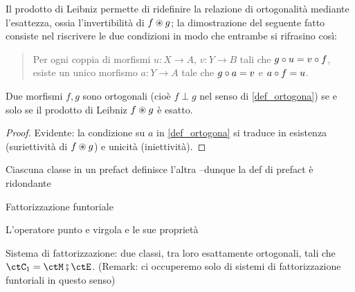 Il prodotto di Leibniz permette di ridefinire la relazione di ortogonalità mediante l'esattezza, ossia l'invertibilità di \(f\oast g\); la dimostrazione del seguente fatto consiste nel riscrivere le due condizioni in modo che entrambe si rifrasino così:
\begin{quote}
	Per ogni coppia di morfismi \(u : X\to A\), \(v : Y\to B\) tali che \(g\circ u=v\circ f\), esiste un unico morfismo \(a : Y\to A\) tale che \(g\circ a=v\) e \(a\circ f=u\).
\end{quote}
\begin{proposition}
	Due morfismi \(f,g\) sono ortogonali (cioè \(f\perp g\) nel senso di \ref{def_ortogona}) se e solo se il prodotto di Leibniz \(f\oast g\) è esatto.
\end{proposition}
\begin{proof}
	Evidente: la condizione su \(a\) in \ref{def_ortogona} si traduce in esistenza (suriettività di \(f\oast g\)) e unicità (iniettività).
\end{proof}
\begin{definition}
	\Todo{}
\end{definition}
\begin{proposition}
	Ciascuna classe in un prefact definisce l'altra --dunque la def di prefact è ridondante
\end{proposition}
\begin{definition}\label{fat_funno}
	Fattorizzazione funtoriale
\end{definition}
\begin{definition}
	L'operatore punto e virgola e le sue proprietà
\end{definition}
\begin{definition}
	Sistema di fattorizzazione: due classi, tra loro esattamente ortogonali, tali che \(\ctC_1 = \ctM \fatsemi \ctE\).
	(Remark: ci occuperemo solo di sistemi di fattorizzazione funtoriali in questo senso)
\end{definition}

